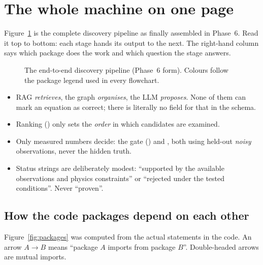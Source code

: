 \section{The whole machine on one page}\label{sec:architecture}

Figure~\ref{fig:pipeline} is the complete discovery pipeline as finally assembled in Phase~6. Read it top to
bottom: each stage hands its output to the next. The right-hand column says which package does the work and
which question the stage answers.

\begin{figure}[!htb]
\centering

\caption{The end-to-end discovery pipeline (Phase~6 form). Colours follow the package legend used in every
flowchart.}
\label{fig:pipeline}
\end{figure}

\begin{lesson}
\begin{itemize}
  \item RAG \emph{retrieves}, the graph \emph{organises}, the LLM \emph{proposes}. None of them can mark an
        equation as correct; there is literally no field for that in the schema.
  \item Ranking () only sets the \emph{order} in which candidates are examined.
  \item Only measured numbers decide: the gate () and , both using
        held-out \emph{noisy} observations, never the hidden truth.
  \item Status strings are deliberately modest: ``supported by the available observations and physics
        constraints'' or ``rejected under the tested conditions''. Never ``proven''.
\end{itemize}
\end{lesson}

\subsection{How the code packages depend on each other}

Figure~\ref{fig:packages} was computed from the actual  statements in the code. An arrow
$A\to B$ means ``package $A$ imports from package $B$''. Double-headed arrows are mutual imports.

